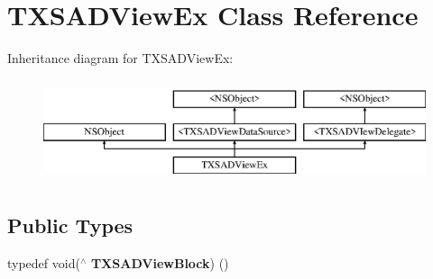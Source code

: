 \hypertarget{interface_t_x_s_a_d_view_ex}{}\section{T\+X\+S\+A\+D\+View\+Ex Class Reference}
\label{interface_t_x_s_a_d_view_ex}
Inheritance diagram for T\+X\+S\+A\+D\+View\+Ex\+:\begin{figure}[H]
\begin{center}
\leavevmode
\includegraphics[height=3.000000cm]{interface_t_x_s_a_d_view_ex}
\end{center}
\end{figure}
\subsection*{Public Types}
\begin{DoxyCompactItemize}
\item 
\hypertarget{interface_t_x_s_a_d_view_ex_a576a777e8ab7c44c75ca16e420fa4c45}{}typedef void($^\wedge$ {\bfseries T\+X\+S\+A\+D\+View\+Block}) ()\label{interface_t_x_s_a_d_view_ex_a576a777e8ab7c44c75ca16e420fa4c45}

\end{DoxyCompactItemize}
